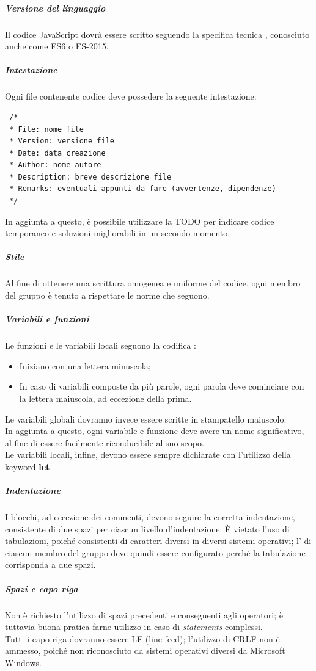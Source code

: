 \documentclass[../norme-di-progetto.tex]{subfiles}
\begin{document}
\subparagraph{Versione del linguaggio}
Il codice JavaScript dovrà essere scritto seguendo la specifica tecnica , conosciuto anche come ES6 o ES-2015.

\subparagraph{Intestazione}
Ogni file contenente codice deve possedere la seguente intestazione:
\begin{lstlisting}
 /*
 * File: nome file
 * Version: versione file
 * Date: data creazione
 * Author: nome autore
 * Description: breve descrizione file
 * Remarks: eventuali appunti da fare (avvertenze, dipendenze)
 */
\end{lstlisting}
In aggiunta a questo, è possibile utilizzare la  TODO per indicare codice temporaneo e soluzioni migliorabili in un secondo momento.

\subparagraph{Stile}
Al fine di ottenere una scrittura omogenea e uniforme del codice, ogni membro del gruppo è tenuto a rispettare le norme che seguono.

\subparagraph*{Variabili e funzioni}
Le funzioni e le variabili locali seguono la codifica :
\begin{itemize}
  \item Iniziano con una lettera minuscola;
  \item In caso di variabili composte da più parole, ogni parola deve cominciare con la lettera maiuscola, ad eccezione della prima.
\end{itemize}
Le variabili globali dovranno invece essere scritte in stampatello maiuscolo. \\
In aggiunta a questo, ogni variabile e funzione deve avere un nome significativo, al fine di essere facilmente riconducibile al suo scopo. \\
Le variabili locali, infine, devono essere sempre dichiarate con l'utilizzo della keyword \textbf{let}.

\subparagraph*{Indentazione}
I blocchi, ad eccezione dei commenti, devono seguire la corretta indentazione, consistente di due spazi per ciascun livello d'indentazione. È vietato l'uso di tabulazioni, poiché consistenti di caratteri diversi in diversi sistemi operativi; l' di ciascun membro del gruppo deve quindi essere configurato perché la tabulazione corrisponda a due spazi.

\subparagraph*{Spazi e capo riga}
Non è richiesto l'utilizzo di spazi precedenti e conseguenti agli operatori; è tuttavia buona pratica farne utilizzo in caso di \textit{statements} complessi. \\
Tutti i capo riga dovranno essere LF (line feed); l'utilizzo di CRLF non è ammesso, poiché non riconosciuto da sistemi operativi diversi da Microsoft Windows.
\end{document}
